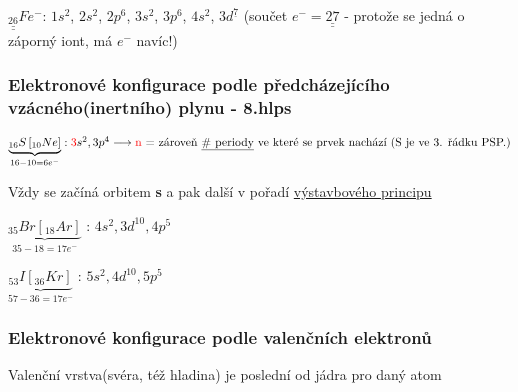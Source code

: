 $\underline{\underline{_{26}}}Fe^-$: $1s^2$, $2s^2$, $2p^6$, $3s^2$, $3p^6$, $4s^2$, $3d^{\underline{7}}$ (součet $e^- = \underline{\underline{27}}$ - protože se jedná o záporný iont, má $e^-$ navíc!)

\subsubsection[Zápis se vzácným plynem]{Elektronové konfigurace podle předcházejícího vzácného(inertního) plynu - 8.hlps}
\(\underbrace{_{16}S\left[_{10}Ne\right]}_{16 - 10 = 6e^-}: \textcolor{red}{3}s^2, 3p^4 \longrightarrow 
    \mbox{\textcolor{red}{n} = zároveň \underline{\# periody} ve které se prvek nachází (S je ve 3. řádku PSP.)}
\)

\vspace{1em}
Vždy se začíná orbitem \textbf{s} a pak další v pořadí \hyperlink{vystavbovyprincip}{výstavbového principu}

\vspace{2em}
\begin{multicols}{2}
    $\underbrace{_{35}Br\left[_{18}Ar\right]}_{35 - 18 = 17e^-}$ : $4s^2, 3d^{10}, 4p^5$
    
    $\underbrace{_{53}I\left[_{36}Kr\right]}_{57 - 36 = 17e^-}$ : $5s^2, 4d^{10}, 5p^5$
\end{multicols}

\subsubsection{Elektronové konfigurace podle valenčních elektronů}
Valenční vrstva(svéra, též hladina) je poslední od jádra pro daný atom


